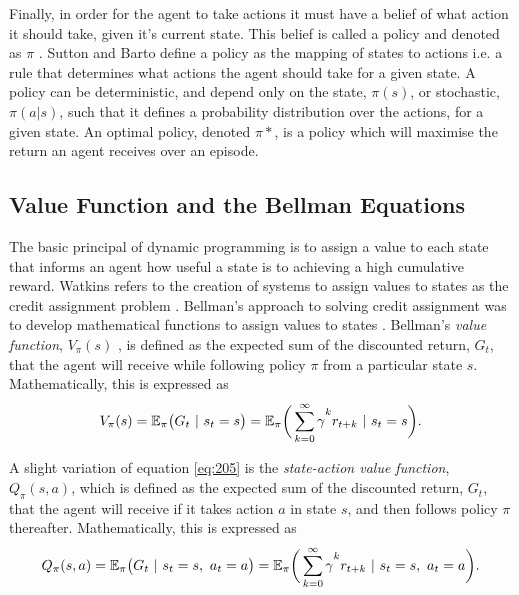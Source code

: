 Finally, in order for the agent to take actions it must have a belief of what action it should take, given it's current state. This belief is called a policy and denoted as $\pi$ \cite{Sutton2018}. Sutton and Barto define a  policy as the mapping of states to actions i.e. a rule that determines what actions the agent should take for a given state. A policy can be deterministic, and depend only on the state, $\pi(s)$, or stochastic, $\pi(a|s)$, such that it defines a probability distribution over the actions, for a given state. An optimal policy, denoted $\pi*$, is a policy which will maximise the return an agent receives over an episode.


\subsection{Value Function and the Bellman Equations}
The basic principal of dynamic programming is to assign a value to each state that informs an agent how useful a state is to achieving a high cumulative reward. Watkins refers to the creation of systems to assign values to states as the credit assignment problem \cite{Watkins1989}. Bellman's approach to solving credit assignment was to develop mathematical functions to assign values to states \cite{Bellm1954}. Bellman's \textit{value function}, $V_{\pi}(s)$ , is defined as the expected sum of the discounted return, $G_t$, that the agent will receive while following policy $\pi$ from a particular state $s$. Mathematically, this is expressed as
\begin{equation}
	V_{\pi}(s) = \mathbb{E}_{\pi} \big( G_t \ | \ s_t = s \big) = \mathbb{E}_{\pi} \bigg( \sum_{k = 0}^{\infty} \gamma\mystrut^k r_{t+k} \ | \ s_t = s \bigg). \label{eq:205}
\end{equation}

A slight variation of equation \ref{eq:205} is the \textit{state-action value function}, $Q_{\pi}(s,a)$, which is defined as the expected sum of the discounted return, $G_t$, that the agent will receive if it takes action $a$ in state $s$, and then follows policy $\pi$ thereafter. Mathematically, this is expressed as
\begin{equation}
	Q_{\pi}(s, a) = \mathbb{E}_{\pi} \big( G_t \ | \ s_t = s, \ a_t = a \big) = \mathbb{E}_{\pi} \bigg( \sum_{k = 0}^{\infty} \gamma\mystrut^k r_{t+k} \ | \ s_t = s, \ a_t = a \bigg). \label{eq:206}
\end{equation}

